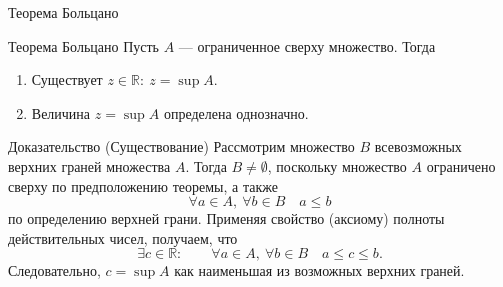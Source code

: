 \documentclass[8pt]{beamer}
\begin{document}

\begin{frame}{Теорема Больцано}

\begin{block}{Теорема Больцано}
Пусть $A$ --- ограниченное сверху множество. Тогда
\begin{enumerate}
\item Существует $z\in\mathbb{R}:\ z=\sup A$. 
\item Величина $z=\sup A$ определена однозначно.
\end{enumerate}
\end{block}
\pause

\begin{block}{Доказательство (Существование)}
Рассмотрим множество $B$ всевозможных верхних граней множества $A$. Тогда $B\ne \emptyset$, поскольку множество $A$ ограничено сверху по предположению теоремы, а также
$$\forall a\in A,\ \forall b \in B \quad a \le b$$
по определению верхней грани. Применяя свойство (аксиому) полноты действительных чисел, получаем, что
$$\exists c\in \mathbb{R}: \qquad \forall a\in A,\ \forall b \in B \quad a\le c \le b.$$
Следовательно, $c=\sup A$ как наименьшая из возможных верхних граней.
\end{block}
\end{frame}
\end{document}
